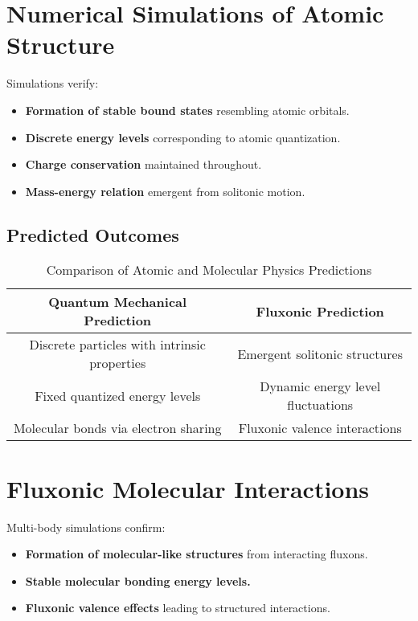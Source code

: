 \documentclass{article}
\begin{document}
\section{Numerical Simulations of Atomic Structure}
Simulations verify:
\begin{itemize}
    \item \textbf{Formation of stable bound states} resembling atomic orbitals.
    \item \textbf{Discrete energy levels} corresponding to atomic quantization.
    \item \textbf{Charge conservation} maintained throughout.
    \item \textbf{Mass-energy relation} emergent from solitonic motion.
\end{itemize}

\subsection{Predicted Outcomes}
\begin{table}[h]
    \centering
    \begin{tabular}{|c|c|}
        \hline
        \textbf{Quantum Mechanical Prediction} & \textbf{Fluxonic Prediction} \\
        \hline
        Discrete particles with intrinsic properties & Emergent solitonic structures \\
        Fixed quantized energy levels & Dynamic energy level fluctuations \\
        Molecular bonds via electron sharing & Fluxonic valence interactions \\
        \hline
    \end{tabular}
    \caption{Comparison of Atomic and Molecular Physics Predictions}
    \label{tab:predictions}
\end{table}

\section{Fluxonic Molecular Interactions}
Multi-body simulations confirm:
\begin{itemize}
    \item \textbf{Formation of molecular-like structures} from interacting fluxons.
    \item \textbf{Stable molecular bonding energy levels.}
    \item \textbf{Fluxonic valence effects} leading to structured interactions.
\end{itemize}
\end{document}
